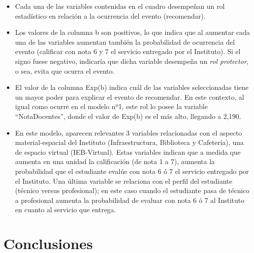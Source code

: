 \documentclass[]{book}
\begin{document}
\begin{itemize}
\item
  Cada una de las variables contenidas en el cuadro desempeñan un rol
  estadístico en relación a la ocurrencia del evento (recomendar).
\item
  Los valores de la columna b son positivos, lo que indica que al
  aumentar cada una de las variables aumentan también la probabilidad de
  ocurrencia del evento (calificar con nota 6 y 7 el servicio entregado
  por el Instituto). Si el signo fuese negativo, indicaría que dicha
  variable desempeña un \emph{rol protector}, o sea, evita que ocurra el
  evento.
\item
  El valor de la columna Exp(b) indica cuál de las variables
  seleccionadas tiene un mayor poder para explicar el evento de
  recomendar. En este contexto, al igual como ocurre en el modelo nº1,
  este rol lo posee la variable ``NotaDocentes'', donde el valor de
  Exp(b) es el más alto, llegando a 2,190.
\item
  En este modelo, aparecen relevantes 3 variables relacionadas con el
  aspecto material-espacial del Instituto (Infraestructura, Biblioteca y
  Cafetería), una de espacio virtual (IEB-Virtual). Estas variables
  indican que a medida que aumenta en una unidad la calificación (de
  nota 1 a 7), aumenta la probabilidad que el estudiante evalúe con nota
  6 ó 7 el servicio entregado por el Instituto. Una última variable se
  relaciona con el perfil del estudiante (técnico versus profesional);
  en este caso cuando el estudiante pasa de técnico a profesional
  aumenta la probabilidad de evaluar con nota 6 ó 7 al Instituto en
  cuanto al servicio que entrega.
\end{itemize}

\chapter{Conclusiones}\label{conclusiones}
\end{document}
